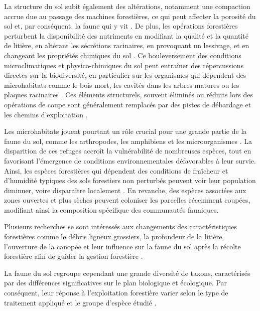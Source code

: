 La structure du sol subit également des altérations, notamment une compaction accrue due au passage des machines forestières, ce qui peut affecter la porosité du sol et, par conséquent, la faune qui y vit \citep{Battigelli2004Shorttermimpact,Mazerolle2021Woodlandsalamander}. 
De plus, les opérations forestières perturbent la disponibilité des nutriments en modifiant la qualité et la quantité de litière, en altérant les sécrétions racinaires, en provoquant un lessivage, et en changeant les propriétés chimiques du sol \citep{Covington1981Changesforest,Marshall2000Impactsforest,Lindo2003Microbialbiomass,Battigelli2004Shorttermimpact}. 
Ce bouleversement des conditions microclimatiques et physico-chimiques du sol peut entraîner des répercussions directes sur la biodiversité, 
en particulier sur les organismes qui dépendent des microhabitats comme le bois mort, les cavités dans les arbres matures ou les plaques racinaires \citep{Berg1994ThreatenedPlant,Spies1999Dynamicforest,Bouget2005Shorttermeffect,Christensen2005Deadwood,Brassard2008EffectsForest}.
Ces éléments structurels, souvent éliminés ou réduits lors des opérations de coupe sont généralement remplacés par des pistes de débardage et les chemins d'exploitation \citep{Hansen1991ConservingBiodiversity}. 

Les microhabitats jouent pourtant un rôle crucial pour une grande partie de la faune du sol, comme les arthropodes, les amphibiens et les microorganismes \citep{Paillet2010Biodiversitydifferences,Fedrowitz2014Canretention,Chaudhary2016Impactforest}. 
La disparition de ces refuges accroît la vulnérabilité de nombreuses espèces, tout en favorisant l’émergence de conditions environnementales défavorables à leur survie. 
Ainsi, les espèces forestières qui dépendent des conditions de fraîcheur et d’humidité typiques des sols forestiers non perturbés peuvent voir leur population diminuer, voire disparaître localement \citep{Kudrin2023metaanalysiseffects}. 
En revanche, des espèces associées aux zones ouvertes et plus sèches peuvent coloniser les parcelles récemment coupées, modifiant ainsi la composition spécifique des communautés fauniques.

Plusieurs recherches se sont intéressés aux changements des caractéristiques forestières comme le débris ligneux grossiers, la profondeur de la litière, l'ouverture de la canopée 
et leur influence sur la faune du sol après la récolte forestière afin de guider la gestion forestière \citep{Semlitsch2002CriticalElements,McKenny2006Effectsstructural}. 

La faune du sol regroupe cependant une grande diversité de taxons, caractérisés par des différences significatives sur le plan biologique et écologique. 
Par conséquent, leur réponse à l'exploitation forestière varier selon le type de traitement appliqué et le groupe d'espèce étudié \citep{Malmstrom2009Dynamicssoil,Paillet2010Biodiversitydifferences}.

